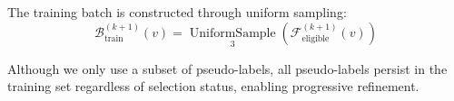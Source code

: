 The training batch is constructed through uniform sampling:
\begin{equation}
\mathcal{B}_{\text{train}}^{(k+1)}(v) = \mathop{\mathrm{UniformSample}}\limits_{3} \left( \mathcal{F}_{\text{eligible}}^{(k+1)}(v) \right)
\end{equation}

Although we only use a subset of pseudo-labels, all pseudo-labels persist in the training set regardless of selection status, enabling progressive refinement.




